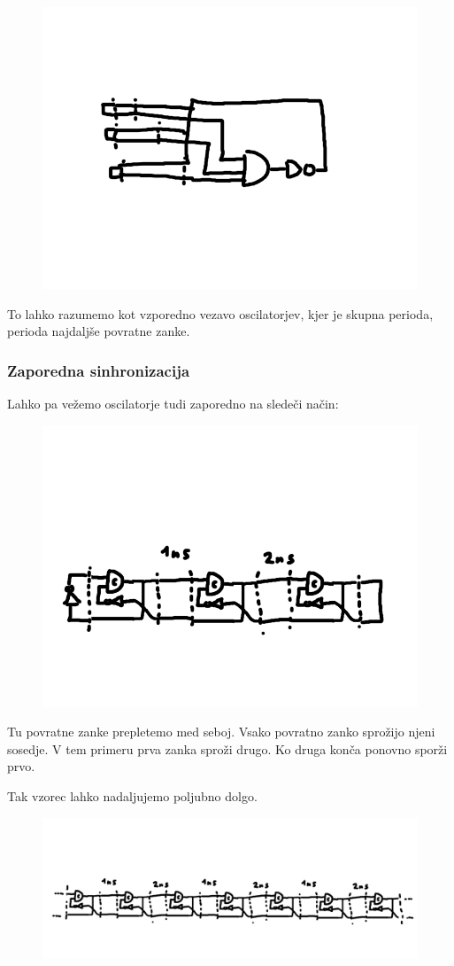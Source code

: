 \begin{figure}
	\centering
	\includegraphics[width=0.7\linewidth]{slike/dly3}
	\caption{}
	\label{fig:celement}
\end{figure}

To lahko razumemo kot vzporedno vezavo oscilatorjev, kjer je skupna perioda, perioda najdaljše povratne zanke. 

\subsubsection{Zaporedna sinhronizacija} \label{c}
Lahko pa vežemo oscilatorje tudi zaporedno na sledeči način:


\begin{figure}
	\centering
	\includegraphics[width=0.7\linewidth]{slike/dly4}
	\caption{}
	\label{fig:celement}
\end{figure}

Tu povratne zanke prepletemo med seboj. Vsako povratno zanko sprožijo njeni sosedje. V tem primeru prva zanka sproži drugo. Ko druga konča ponovno sporži prvo.

Tak vzorec lahko nadaljujemo poljubno dolgo.
\begin{figure}
	\centering
	\includegraphics[width=0.7\linewidth]{slike/dly5}
	\caption{}
	\label{fig:celement}
\end{figure}


